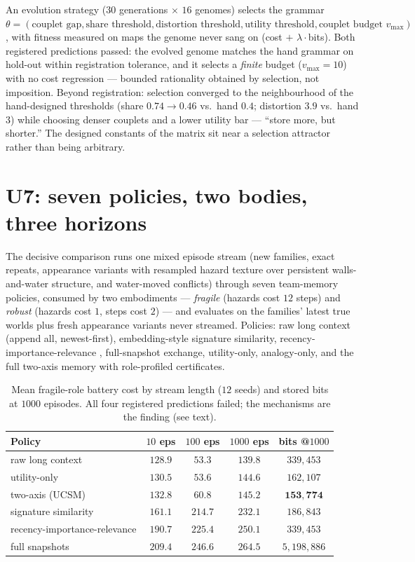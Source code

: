 \documentclass{article}
\begin{document}
An evolution strategy ($30$ generations $\times$ $16$ genomes)
selects the grammar $\theta = (\text{couplet gap},
\text{share threshold}, \text{distortion threshold},
\text{utility threshold}, \text{couplet budget } v_{\max})$, with
fitness measured on maps the genome never sang on (cost $+$
$\lambda\cdot$bits). Both registered predictions passed: the evolved
genome matches the hand grammar on hold-out within registration
tolerance, and it selects a \emph{finite} budget ($v_{\max} = 10$)
with no cost regression --- bounded rationality obtained by
selection, not imposition. Beyond registration: selection converged
to the neighbourhood of the hand-designed thresholds (share
$0.74 \to 0.46$ vs.\ hand $0.4$; distortion $3.9$ vs.\ hand $3$)
while choosing denser couplets and a lower utility bar --- ``store
more, but shorter.'' The designed constants of the matrix sit near a
selection attractor rather than being arbitrary.

\section{U7: seven policies, two bodies, three horizons}
\label{p5:sec:u7}

The decisive comparison runs one mixed episode stream (new families,
exact repeats, appearance variants with resampled hazard texture over
persistent walls-and-water structure, and water-moved conflicts)
through seven team-memory policies, consumed by two embodiments ---
\emph{fragile} (hazards cost $12$ steps) and \emph{robust} (hazards
cost $1$, steps cost $2$) --- and evaluates on the families' latest
true worlds plus fresh appearance variants never streamed. Policies:
raw long context (append all, newest-first), embedding-style
signature similarity, recency-importance-relevance
\citep{genagents2023}, full-snapshot exchange, utility-only,
analogy-only, and the full two-axis memory with role-profiled
certificates.

\begin{table}[h]
\centering
\caption{Mean fragile-role battery cost by stream length ($12$ seeds)
and stored bits at $1000$ episodes. All four registered predictions
failed; the mechanisms are the finding (see text).}
\label{p5:tab:u7}
\small
\begin{tabular}{lcccc}
\toprule
Policy & $10$ eps & $100$ eps & $1000$ eps & bits @$1000$ \\
\midrule
raw long context & $128.9$ & $\mathbf{53.3}$ & $\mathbf{139.8}$ & $339{,}453$ \\
utility-only & $130.5$ & $53.6$ & $144.6$ & $162{,}107$ \\
two-axis (UCSM) & $132.8$ & $60.8$ & $145.2$ & $\mathbf{153{,}774}$ \\
signature similarity & $161.1$ & $214.7$ & $232.1$ & $186{,}843$ \\
recency-importance-relevance & $190.7$ & $225.4$ & $250.1$ & $339{,}453$ \\
full snapshots & $209.4$ & $246.6$ & $264.5$ & $5{,}198{,}886$ \\
\bottomrule
\end{tabular}
\end{table}
\end{document}
